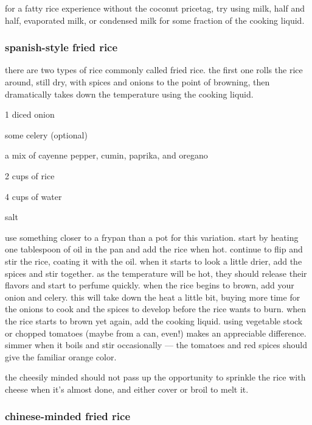 for a fatty rice experience without the coconut pricetag, try using
milk, half and half, evaporated milk, or condensed milk for some
fraction of the cooking liquid.

\subsubsection{spanish-style fried rice}

there are two types of rice commonly called fried rice. the first one
rolls the rice around, still dry, with spices and onions to the point
of browning, then dramatically takes down the temperature using the
cooking liquid.

\begin{ingredients}
  \item 1 diced onion
  \item some celery (optional)
  \item a mix of cayenne pepper, cumin, paprika, and oregano
  \item 2 cups of rice
  \item 4 cups of water
  \item salt
\end{ingredients}

use something closer to a frypan than a pot for this variation. start
by heating one tablespoon of oil in the pan and add the rice when
hot. continue to flip and stir the rice, coating it with the oil. when
it starts to look a little drier, add the spices and stir together. as
the temperature will be hot, they should release their flavors and
start to perfume quickly. when the rice begins to brown, add your
onion and celery. this will take down the heat a little bit, buying
more time for the onions to cook and the spices to develop before the
rice wants to burn. when the rice starts to brown yet again, add the
cooking liquid. using vegetable stock or chopped tomatoes (maybe from
a can, even!) makes an appreciable difference. simmer when it boils
and stir occasionally --- the tomatoes and red spices should give the
familiar orange color.

the cheesily minded should not pass up the opportunity to sprinkle the
rice with cheese when it's almost done, and either cover or broil to
melt it.

\subsubsection{chinese-minded fried rice}

